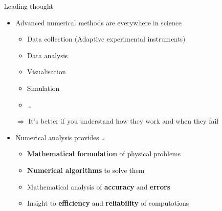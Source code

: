 \begin{frame}{Leading thought}
    \begin{itemize}
        \item Advanced numerical methods are everywhere in science
            \begin{itemize}
                \vspace{-0.2em}
                \item Data collection \textcolor{grey5}{(Adaptive experimental instruments)}
                \vspace{-0.2em}
                \item Data analysis
                \vspace{-0.2em}
                \item Visualisation
                \vspace{-0.2em}
                \item Simulation
                \vspace{-0.2em}
                \item \ldots
            \end{itemize}
    \vspace{1.5em}
    \item[$\Rightarrow$] \alert{It's better if you understand how they work} and when they fail
    \vspace{1.5em}
        \item Numerical analysis provides \ldots
            \begin{itemize}
                \item \textbf{Mathematical formulation} of physical problems
                \vspace{-0.2em}
                \item \textbf{Numerical algorithms} to solve them
                \vspace{-0.2em}
                \item Mathematical analysis of \textbf{accuracy} and \textbf{errors}
                \vspace{-0.2em}
                \item Insight to
                    \textbf{efficiency} and \textbf{reliability} of computations
            \end{itemize}
    \end{itemize}
\end{frame}

